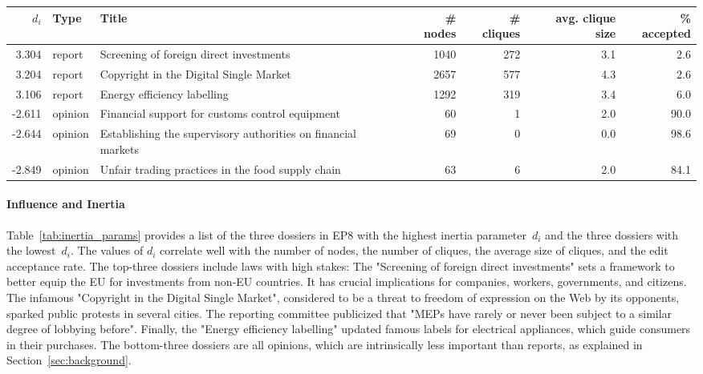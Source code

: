 \begin{table*}
	\caption{Top-3 and bottom-3 dossiers in EP8 according to their inertia parameters $d_i$.}
	\label{tab:inertia_params}
	\begin{tabular}{rllrrrr}
		\toprule
		$d_i$  & Type    & Title                                                         & \# nodes & \# cliques & avg. clique size & \% accepted \\
		\midrule

		3.304  & report  & Screening of foreign direct investments                       & 1040     & 272        & 3.1              & 2.6         \\
		3.204  & report  & Copyright in the Digital Single Market                        & 2657     & 577        & 4.3              & 2.6         \\
		3.106  & report  & Energy efficiency labelling                                   & 1292     & 319        & 3.4              & 6.0         \\

		\midrule

		-2.611 & opinion & Financial support for customs control equipment               & 60       & 1          & 2.0              & 90.0        \\
		-2.644 & opinion & Establishing the supervisory authorities on financial markets & 69       & 0          & 0.0              & 98.6        \\
		-2.849 & opinion & Unfair trading practices in the food supply chain             & 63       & 6          & 2.0              & 84.1        \\

		\bottomrule
	\end{tabular}
\end{table*}

\paragraph{Influence and Inertia}
Table~\ref{tab:inertia_params} provides a list of the three dossiers in EP8 with the highest inertia parameter~$d_i$ and the three dossiers with the lowest~$ d_i $.
The values of $d_i$ correlate well with the number of nodes, the number of cliques, the average size of cliques, and the edit acceptance rate.
The top-three dossiers include laws with high stakes:
The "Screening of foreign direct investments" sets a framework to better equip the EU for investments from non-EU countries.
It has crucial implications for companies, workers, governments, and citizens.
The infamous "Copyright in the Digital Single Market", considered to be a threat to freedom of expression on the Web by its opponents, sparked public protests in several cities.
The reporting committee publicized that "MEPs have rarely or never been subject to a similar degree of lobbying before"\cite{europarl2019questions}.
Finally, the "Energy efficiency labelling" updated famous labels for electrical appliances, which guide consumers in their purchases.
The bottom-three dossiers are all opinions, which are intrinsically less important than reports, as explained in Section~\ref{sec:background}.
